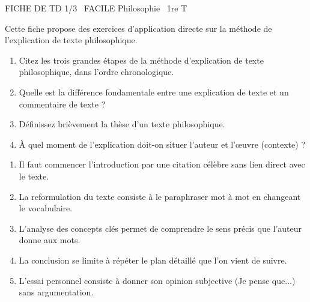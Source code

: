 \documentclass[11pt]{article}
\begin{document}
\begin{tcolorbox}[enhanced,colback=popink,colframe=popink,arc=10pt,boxrule=0pt,left=12pt,right=12pt,top=9pt,bottom=9pt]
{\color{white}\popxbold\small FICHE DE TD 1/3 \textbullet\ FACILE \hfill Philosophie \textbullet\ 1re T\par}
\end{tcolorbox}
\vspace{4pt}
Cette fiche propose des exercices d'application directe sur la méthode de l'explication de texte philosophique.

\begin{exercice}
\begin{enumerate}
    \item Citez les trois grandes étapes de la méthode d'explication de texte philosophique, dans l'ordre chronologique.
    \item Quelle est la différence fondamentale entre une \og explication de texte \fg{} et un \og commentaire de texte \fg{} ?
    \item Définissez brièvement la \og thèse \fg{} d'un texte philosophique.
    \item À quel moment de l'explication doit-on situer l'auteur et l'œuvre (contexte) ?
\end{enumerate}
\end{exercice}

\begin{exercice}
\begin{enumerate}
    \item Il faut commencer l'introduction par une citation célèbre sans lien direct avec le texte.
    \item La reformulation du texte consiste à le paraphraser mot à mot en changeant le vocabulaire.
    \item L'analyse des concepts clés permet de comprendre le sens précis que l'auteur donne aux mots.
    \item La conclusion se limite à répéter le plan détaillé que l'on vient de suivre.
    \item L'essai personnel consiste à donner son opinion subjective (\og Je pense que...\fg) sans argumentation.
\end{enumerate}
\end{exercice}
\end{document}

